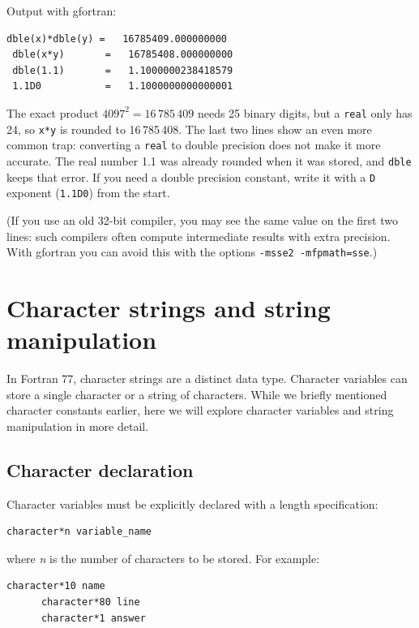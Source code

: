Output with gfortran:

\begin{lstlisting}[style=output]
 dble(x)*dble(y) =   16785409.000000000
 dble(x*y)       =   16785408.000000000
 dble(1.1)       =   1.1000000238418579
 1.1D0           =   1.1000000000000001
\end{lstlisting}

The exact product $4097^2 = 16\,785\,409$ needs 25 binary digits, but a \texttt{real} only has 24, so \texttt{x*y} is rounded to 16\,785\,408. The last two lines show an even more common trap: converting a \texttt{real} to double precision does not make it more accurate. The real number 1.1 was already rounded when it was stored, and \texttt{dble} keeps that error. If you need a double precision constant, write it with a \texttt{D} exponent (\texttt{1.1D0}) from the start.

(If you use an old 32-bit compiler, you may see the same value on the first two lines: such compilers often compute intermediate results with extra precision. With gfortran you can avoid this with the options \texttt{-msse2 -mfpmath=sse}.)


\section{Character strings and string manipulation}

In Fortran 77, character strings are a distinct data type. Character variables can store a single character or a string of characters. While we briefly mentioned character constants earlier, here we will explore character variables and string manipulation in more detail.

\subsection{Character declaration}

Character variables must be explicitly declared with a length specification:

\begin{lstlisting}[style=fortran77]
      character*n variable_name
\end{lstlisting}

where \emph{n} is the number of characters to be stored. For example:

\begin{lstlisting}[style=fortran77]
      character*10 name
      character*80 line
      character*1 answer
\end{lstlisting}

